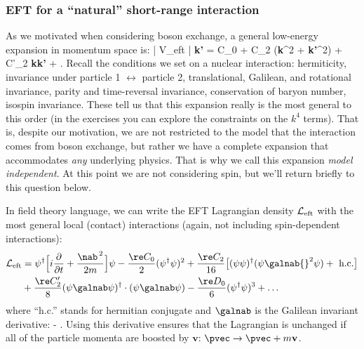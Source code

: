 \subsubsection{EFT for a ``natural'' short-range interaction}

As we motivated when considering boson exchange, a 
general low-energy expansion
in momentum space is:
%
\beq
   | V_{\rm eft} | {\bf k'}\rangle
   = C_0 +  C_2 ({\bf k}^2 + {\bf k'}^2)
     + C'_2 {\bf k\cdot k'} + \cdots \;.
     \label{eq:Veft}
\eeq
% 
Recall the conditions we set on a nuclear interaction: hermiticity,
invariance under particle 1 $\longleftrightarrow$ particle 2, translational,
Galilean, and rotational invariance, parity and time-reversal invariance, conservation
of baryon number, isospin invariance.
These tell us that this expansion really is the most general to this order
(in the exercises you can explore the constraints on the $k^4$ terms).
That is, despite our motivation, we are not restricted to the model that
the interaction comes from boson exchange, but rather we have a complete
expansion that accommodates \emph{any} underlying physics.  That is why we call
this expansion \emph{model independent}.
At this point we are not considering spin, but we'll return briefly to
this question below.



In field theory language, we can write the EFT Lagrangian
density ${\cal L}_{\rm eft}$ with the
most general local (contact) interactions (again, not including spin-dependent
interactions): 
\begin{align}
  {\cal L}_{\rm eft}  &=
       \psi^\dagger \Bigl[i\frac{\partial}{\partial t} 
               + \frac{\nab^{\,2}}{2m}\Bigr]
                 \psi - \frac{{\re C_0}}{2}(\psi^\dagger \psi)^2
            + \frac{{\re C_2}}{16}\bigl[ (\psi\psi)^\dagger 
                                  (\psi\galnab{}^2\psi)+\mbox{ h.c.} 
                             \bigr]   
  \nonumber \\
   &  \null +
         \frac{{\re C_2'}}{8}(\psi \galnab \psi)^\dagger \cdot
              (\psi\galnab\psi)
   - \frac{{\re D_0}}{6}(\psi^\dagger \psi)^3 +  \ldots
   \label{eq:Left}
\end{align}
where ``h.c.'' stands for hermitian conjugate and $\galnab$ is
the Galilean invariant derivative:
\beq
  \galnab \equiv \overleftarrow{\nabla} - \overrightarrow{\nabla}
  \;.
\eeq
Using this derivative ensures that the Lagrangian is unchanged if all
of the particle momenta are boosted by $\bm{v}$: $\pvec \rightarrow
\pvec + m\bf{v}$.

